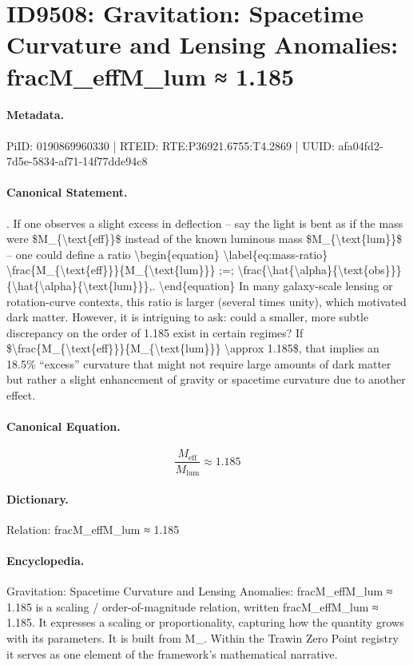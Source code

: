 \section*{ID9508: Gravitation: Spacetime Curvature and Lensing Anomalies: fracM\_effM\_lum ≈ 1.185}
\paragraph{Metadata.}
PiID: 0190869960330 | RTEID: RTE:P36921.6755:T4.2869 | UUID: afa04fd2-7d5e-5834-af71-14f77dde94c8

\paragraph{Canonical Statement.}
. If one observes a slight excess in deflection – say the light is bent as if the mass were \$M\_\{\textbackslash{}text\{eff\}\}\$ instead of the known luminous mass \$M\_\{\textbackslash{}text\{lum\}\}\$ – one could define a ratio \textbackslash{}begin\{equation\} \textbackslash{}label\{eq:mass-ratio\} \textbackslash{}frac\{M\_\{\textbackslash{}text\{eff\}\}\}\{M\_\{\textbackslash{}text\{lum\}\}\} ;=; \textbackslash{}frac\{\textbackslash{}hat\{\textbackslash{}alpha\}\{\textbackslash{}text\{obs\}\}\}\{\textbackslash{}hat\{\textbackslash{}alpha\}\{\textbackslash{}text\{lum\}\}\},. \textbackslash{}end\{equation\} In many galaxy-scale lensing or rotation-curve contexts, this ratio is larger (several times unity), which motivated dark matter. However, it is intriguing to ask: could a smaller, more subtle discrepancy on the order of 1.185 exist in certain regimes? If \$\textbackslash{}frac\{M\_\{\textbackslash{}text\{eff\}\}\}\{M\_\{\textbackslash{}text\{lum\}\}\} \textbackslash{}approx 1.185\$, that implies an 18.5\% “excess” curvature that might not require large amounts of dark matter but rather a slight enhancement of gravity or spacetime curvature due to another effect.

\paragraph{Canonical Equation.}
\[
\frac{M_{\text{eff}}}{M_{\text{lum}}} \approx 1.185
\]

\paragraph{Dictionary.}
Relation: fracM\_effM\_lum ≈ 1.185

\paragraph{Encyclopedia.}
Gravitation: Spacetime Curvature and Lensing Anomalies: fracM\_effM\_lum ≈ 1.185 is a scaling / order-of-magnitude relation, written fracM\_effM\_lum ≈ 1.185. It expresses a scaling or proportionality, capturing how the quantity grows with its parameters. It is built from M\_. Within the Trawin Zero Point registry it serves as one element of the framework's mathematical narrative.
